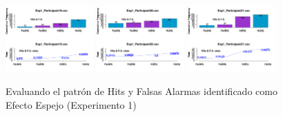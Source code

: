 \begin{figure}[th]
\includegraphics[width=0.30\textwidth]{Figures/MirrorRate_Exp1_P19} \includegraphics[width=0.30\textwidth]{Figures/MirrorRate_Exp1_P20} \includegraphics[width=0.30\textwidth]{Figures/MirrorRate_Exp1_P21} 
\caption[Rate_Exp1]{Evaluando el patrón de Hits y Falsas Alarmas identificado como Efecto Espejo (Experimento 1)}
\label{fig:Rate_E1}
\end{figure}


